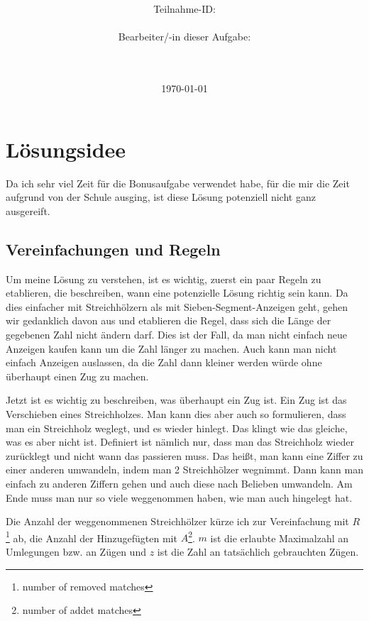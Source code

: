 \documentclass[a4paper,10pt,ngerman]{scrartcl}
\title{\textbf{\Huge\Aufgabe}}
\author{\LARGE Teilnahme-ID: \LARGE \TeilnahmeId \\\\
	    \LARGE Bearbeiter/-in dieser Aufgabe: \\ 
	    \LARGE \Name\\\\}
\date{\LARGE\today}
\begin{document}
\maketitle

\setcounter{tocdepth}{3}
\tableofcontents

\vspace{0.5cm}

\section{Lösungsidee}

Da ich sehr viel Zeit für die Bonusaufgabe verwendet habe, für die mir die Zeit aufgrund von der Schule ausging, ist diese Lösung potenziell nicht ganz ausgereift.

\subsection{Vereinfachungen und Regeln}

Um meine Lösung zu verstehen, ist es wichtig, zuerst ein paar Regeln zu etablieren, die beschreiben, wann eine potenzielle Lösung richtig sein kann. Da dies einfacher mit Streichhölzern als mit Sieben-Segment-Anzeigen geht, gehen wir gedanklich davon aus und etablieren die Regel, dass sich die Länge der gegebenen Zahl nicht ändern darf. Dies ist der Fall, da man nicht einfach neue Anzeigen kaufen kann um die Zahl länger zu machen. Auch kann man nicht einfach Anzeigen auslassen, da die Zahl dann kleiner werden würde ohne überhaupt einen Zug zu machen.

Jetzt ist es wichtig zu beschreiben, was überhaupt ein Zug ist. Ein Zug ist das Verschieben eines Streichholzes. Man kann dies aber auch so formulieren, dass man ein Streichholz weglegt, und es wieder hinlegt. Das klingt wie das gleiche, was es aber nicht ist. Definiert ist nämlich nur, dass man das Streichholz wieder zurücklegt und nicht wann das passieren muss. Das heißt, man kann eine Ziffer zu einer anderen umwandeln, indem man 2 Streichhölzer wegnimmt. Dann kann man einfach zu anderen Ziffern gehen und auch diese nach Belieben umwandeln. Am Ende muss man nur so viele weggenommen haben, wie man auch hingelegt hat.

Die Anzahl der weggenommenen Streichhölzer kürze ich zur Vereinfachung mit $R$\footnote{number of removed matches} ab, die Anzahl der Hinzugefügten mit $A$\footnote{number of addet matches}. $m$ ist die erlaubte Maximalzahl an Umlegungen bzw. an Zügen und $z$ ist die Zahl an tatsächlich gebrauchten Zügen.
\end{document}
